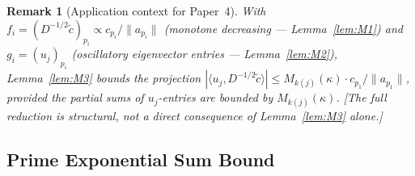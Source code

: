 \documentclass[11pt]{article}
\newtheorem*{remark}{Remark}
\begin{document}
\begin{remark}[Application context for Paper~4]
With $f_i = (D^{-1/2}\tilde{c})_{p_i}\propto c_{p_i}/\|a_{p_i}\|$
(monotone decreasing --- Lemma~\ref{lem:M1}) and $g_i = (u_j)_{p_i}$
(oscillatory eigenvector entries --- Lemma~\ref{lem:M2}),
Lemma~\ref{lem:M3} bounds the projection
$|\langle u_j, D^{-1/2}\tilde{c}\rangle|
\leq M_{k(j)}(\kappa)\cdot c_{p_1}/\|a_{p_1}\|$,
provided the partial sums of $u_j$-entries are bounded by
$M_{k(j)}(\kappa)$.
\emph{[The full reduction is structural, not a direct consequence of
Lemma~\ref{lem:M3} alone.]}
\end{remark}

\subsection{Prime Exponential Sum Bound}
\end{document}
